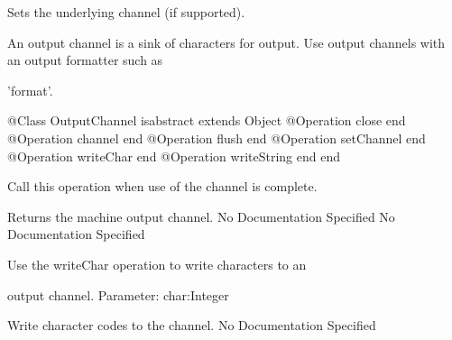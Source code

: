           Sets the underlying channel (if supported).

      An output channel is a sink of characters for output. 
      Use output channels with an output formatter such as

      'format'.
\begin{Interface}
@Class OutputChannel isabstract extends Object
  @Operation close end
  @Operation channel end
  @Operation flush end
  @Operation setChannel end
  @Operation writeChar end
  @Operation writeString end
end
\end{Interface}

        Call this operation when use of the channel is complete.

        Returns the machine output channel.
No Documentation Specified
No Documentation Specified

        Use the writeChar operation to write characters to an

        output channel.
        Parameter: char:Integer

          Write character codes to the channel.
No Documentation Specified

